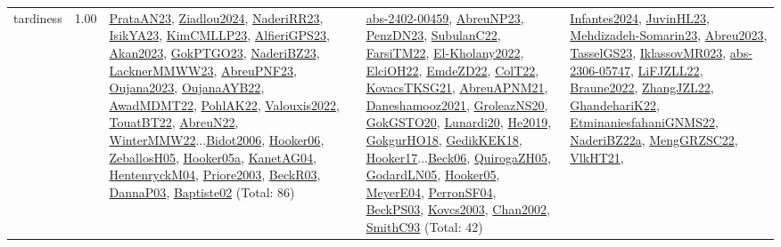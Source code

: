 {\begin{longtable}{p{3cm}r>{\raggedright\arraybackslash}p{6cm}>{\raggedright\arraybackslash}p{6cm}>{\raggedright\arraybackslash}p{8cm}}
\index{tardiness}\index{Concepts!tardiness}tardiness &  1.00 & \hyperref[detail:PrataAN23]{PrataAN23}, \hyperref[detail:Ziadlou2024]{Ziadlou2024}, \hyperref[detail:NaderiRR23]{NaderiRR23}, \hyperref[detail:IsikYA23]{IsikYA23}, \hyperref[detail:KimCMLLP23]{KimCMLLP23}, \hyperref[detail:AlfieriGPS23]{AlfieriGPS23}, \hyperref[detail:Akan2023]{Akan2023}, \hyperref[detail:GokPTGO23]{GokPTGO23}, \hyperref[detail:NaderiBZ23]{NaderiBZ23}, \hyperref[detail:LacknerMMWW23]{LacknerMMWW23}, \hyperref[detail:AbreuPNF23]{AbreuPNF23}, \hyperref[detail:Oujana2023]{Oujana2023}, \hyperref[detail:OujanaAYB22]{OujanaAYB22}, \hyperref[detail:AwadMDMT22]{AwadMDMT22}, \hyperref[detail:PohlAK22]{PohlAK22}, \hyperref[detail:Valouxis2022]{Valouxis2022}, \hyperref[detail:TouatBT22]{TouatBT22}, \hyperref[detail:AbreuN22]{AbreuN22}, \hyperref[detail:WinterMMW22]{WinterMMW22}...\hyperref[detail:Bidot2006]{Bidot2006}, \hyperref[detail:Hooker06]{Hooker06}, \hyperref[detail:ZeballosH05]{ZeballosH05}, \hyperref[detail:Hooker05a]{Hooker05a}, \hyperref[detail:KanetAG04]{KanetAG04}, \hyperref[detail:HentenryckM04]{HentenryckM04}, \hyperref[detail:Priore2003]{Priore2003}, \hyperref[detail:BeckR03]{BeckR03}, \hyperref[detail:DannaP03]{DannaP03}, \hyperref[detail:Baptiste02]{Baptiste02} (Total: 86) & \hyperref[detail:abs-2402-00459]{abs-2402-00459}, \hyperref[detail:AbreuNP23]{AbreuNP23}, \hyperref[detail:PenzDN23]{PenzDN23}, \hyperref[detail:SubulanC22]{SubulanC22}, \hyperref[detail:FarsiTM22]{FarsiTM22}, \hyperref[detail:El-Kholany2022]{El-Kholany2022}, \hyperref[detail:ElciOH22]{ElciOH22}, \hyperref[detail:EmdeZD22]{EmdeZD22}, \hyperref[detail:ColT22]{ColT22}, \hyperref[detail:KovacsTKSG21]{KovacsTKSG21}, \hyperref[detail:AbreuAPNM21]{AbreuAPNM21}, \hyperref[detail:Daneshamooz2021]{Daneshamooz2021}, \hyperref[detail:GroleazNS20]{GroleazNS20}, \hyperref[detail:GokGSTO20]{GokGSTO20}, \hyperref[detail:Lunardi20]{Lunardi20}, \hyperref[detail:He2019]{He2019}, \hyperref[detail:GokgurHO18]{GokgurHO18}, \hyperref[detail:GedikKEK18]{GedikKEK18}, \hyperref[detail:Hooker17]{Hooker17}...\hyperref[detail:Beck06]{Beck06}, \hyperref[detail:QuirogaZH05]{QuirogaZH05}, \hyperref[detail:GodardLN05]{GodardLN05}, \hyperref[detail:Hooker05]{Hooker05}, \hyperref[detail:MeyerE04]{MeyerE04}, \hyperref[detail:PerronSF04]{PerronSF04}, \hyperref[detail:BeckPS03]{BeckPS03}, \hyperref[detail:Kovcs2003]{Kovcs2003}, \hyperref[detail:Chan2002]{Chan2002}, \hyperref[detail:SmithC93]{SmithC93} (Total: 42) & \hyperref[detail:Infantes2024]{Infantes2024}, \hyperref[detail:JuvinHL23]{JuvinHL23}, \hyperref[detail:Mehdizadeh-Somarin23]{Mehdizadeh-Somarin23}, \hyperref[detail:Abreu2023]{Abreu2023}, \hyperref[detail:TasselGS23]{TasselGS23}, \hyperref[detail:IklassovMR023]{IklassovMR023}, \hyperref[detail:abs-2306-05747]{abs-2306-05747}, \hyperref[detail:LiFJZLL22]{LiFJZLL22}, \hyperref[detail:Braune2022]{Braune2022}, \hyperref[detail:ZhangJZL22]{ZhangJZL22}, \hyperref[detail:GhandehariK22]{GhandehariK22}, \hyperref[detail:EtminaniesfahaniGNMS22]{EtminaniesfahaniGNMS22}, \hyperref[detail:NaderiBZ22a]{NaderiBZ22a}, \hyperref[detail:MengGRZSC22]{MengGRZSC22}, \hyperref[detail:VlkHT21]{VlkHT21}, 
\end{longtable}}
